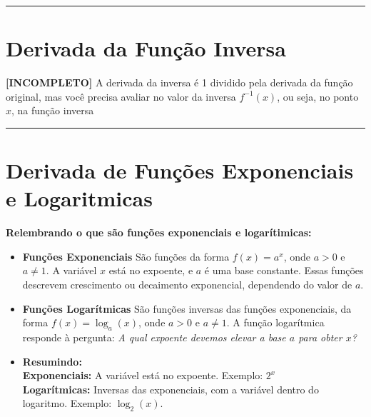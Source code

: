 \documentclass{article}
\begin{document}
\vspace{15pt}
\hrule
\section{Derivada da Função Inversa}
\textbf{[INCOMPLETO]} A derivada da inversa é 1 dividido pela derivada da função original, mas você precisa avaliar no valor da inversa $f^{-1}(x)$, ou seja, no ponto $x$, na função inversa
\vspace{15pt}
\hrule
\section{Derivada de Funções Exponenciais e Logaritmicas}
\textbf{Relembrando o que são funções exponenciais e logarítimicas:}
\begin{itemize}
\item\textbf{Funções Exponenciais}
São funções da forma \( f(x) = a^x \), onde \( a > 0 \) e \( a \neq 1 \). A variável \( x \) está no expoente, e \( a \) é uma base constante. Essas funções descrevem crescimento ou decaimento exponencial, dependendo do valor de \( a \).

\item\textbf{Funções Logarítmicas}
São funções inversas das funções exponenciais, da forma \( f(x) = \log_a(x) \), onde \( a > 0 \) e \( a \neq 1 \). A função logarítmica responde à pergunta: \emph{A qual expoente devemos elevar a base \( a \) para obter \( x \)?}

\item\textbf{Resumindo:}\\[10pt]
\textbf{Exponenciais:} A variável está no expoente. Exemplo: \( 2^x \)\\[10pt]
\textbf{Logarítmicas:} Inversas das exponenciais, com a variável dentro do logaritmo. Exemplo: \( \log_2(x) \).
\end{itemize}
\end{document}

